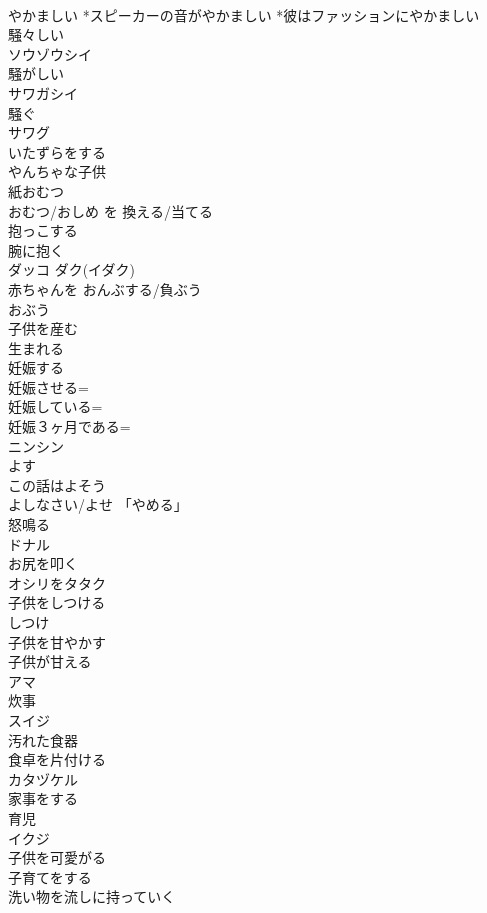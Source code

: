 \documentclass[8pt]{extreport}
\begin{document}
\begin{CJK}{UTF8}{min}
\\	やかましい *スピーカーの音がやかましい *彼はファッションにやかましい	
\\	騒々しい	
\\	ソウゾウシイ
\\	騒がしい	
\\	サワガシイ
\\	騒ぐ	
\\	サワグ
\\	いたずらをする	
\\	やんちゃな子供	
\\	紙おむつ	
\\	おむつ/おしめ を 換える/当てる	
\\	抱っこする 
\\	腕に抱く	
\\	ダッコ ダク(イダク)
\\	赤ちゃんを おんぶする/負ぶう	
\\	おぶう
\\	子供を産む 
\\	生まれる	
\\	妊娠する	
\\	妊娠させる=
\\	妊娠している=
\\	妊娠３ヶ月である=
\\	ニンシン
\\	よす 
\\	この話はよそう 
\\	よしなさい/よせ	「やめる」
\\	怒鳴る	
\\	ドナル
\\	お尻を叩く	
\\	オシリをタタク
\\	子供をしつける 
\\	しつけ	
\\	子供を甘やかす 
\\	子供が甘える	
\\	アマ~
\\	炊事	
\\	スイジ
\\	汚れた食器	
\\	食卓を片付ける	
\\	カタヅケル
\\	家事をする	
\\	育児	
\\	イクジ
\\	子供を可愛がる	
\\	子育てをする	
\\	洗い物を流しに持っていく	

\end{CJK}
\end{document}
